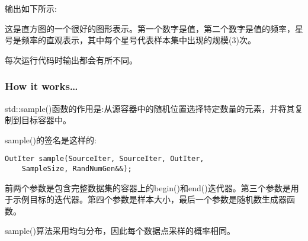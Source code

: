 \begin{itemize}
输出如下所示:


这是直方图的一个很好的图形表示。第一个数字是值，第二个数字是值的频率，星号是频率的直观表示，其中每个星号代表样本集中出现的规模(3)次。

每次运行代码时输出都会有所不同。
\end{itemize}

\subsubsection{How it works…}

std::sample()函数的作用是:从源容器中的随机位置选择特定数量的元素，并将其复制到目标容器中。

sample()的签名是这样的:

\begin{lstlisting}[style=styleCXX]
OutIter sample(SourceIter, SourceIter, OutIter,
	SampleSize, RandNumGen&&);
\end{lstlisting}

前两个参数是包含完整数据集的容器上的begin()和end()迭代器。第三个参数是用于示例目标的迭代器。第四个参数是样本大小，最后一个参数是随机数生成器函数。

sample()算法采用均匀分布，因此每个数据点采样的概率相同。
























